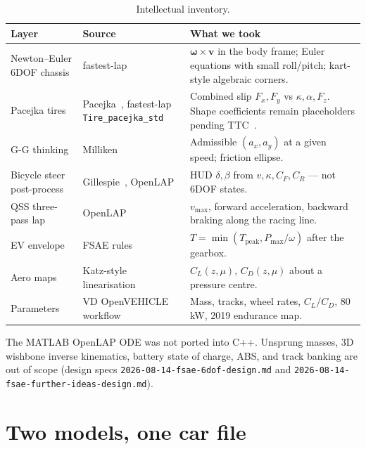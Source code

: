 \documentclass[11pt,letterpaper]{article}
\begin{document}
\begin{table}[ht]
\centering
\caption{Intellectual inventory.}
\begin{tabular}{@{}llp{7.2cm}@{}}
\toprule
Layer & Source & What we took \\
\midrule
Newton--Euler 6DOF chassis
  & fastest-lap~\cite{manzanero-fastestlap}
  & $\boldsymbol{\omega}\times\mathbf{v}$ in the body frame; Euler
    equations with small roll/pitch; kart-style algebraic corners. \\
Pacejka tires
  & Pacejka~\cite{pacejka}, fastest-lap \texttt{Tire\_pacejka\_std}
  & Combined slip $F_x,F_y$ vs $\kappa,\alpha,F_z$. Shape coefficients
    remain placeholders pending TTC~\cite{ttc}. \\
G-G thinking
  & Milliken~\cite{milliken}
  & Admissible $(a_x,a_y)$ at a given speed; friction ellipse. \\
Bicycle steer post-process
  & Gillespie~\cite{gillespie}, OpenLAP~\cite{openlap}
  & HUD $\delta,\beta$ from $v,\kappa,C_F,C_R$ --- not 6DOF states. \\
QSS three-pass lap
  & OpenLAP~\cite{openlap}
  & $v_{\max}$, forward acceleration, backward braking along the
    racing line. \\
EV envelope
  & FSAE rules~\cite{fsae-rules}
  & $T=\min(T_{\mathrm{peak}}, P_{\max}/\omega)$ after the gearbox. \\
Aero maps
  & Katz-style linearisation~\cite{katz}
  & $C_L(z,\mu)$, $C_D(z,\mu)$ about a pressure centre. \\
Parameters
  & VD OpenVEHICLE workflow~\cite{jones-linkedin,openlap}
  & Mass, tracks, wheel rates, $C_L/C_D$, 80\,\si{\kilo\watt}, 2019
    endurance map. \\
\bottomrule
\end{tabular}
\end{table}

The MATLAB OpenLAP ODE was not ported into C++. Unsprung masses, 3D
wishbone inverse kinematics, battery state of charge, ABS, and track
banking are out of scope (design specs
\texttt{2026-08-14-fsae-6dof-design.md} and
\texttt{2026-08-14-fsae-further-ideas-design.md}).

\section{Two models, one car file}
\label{sec:two-models}
\end{document}
